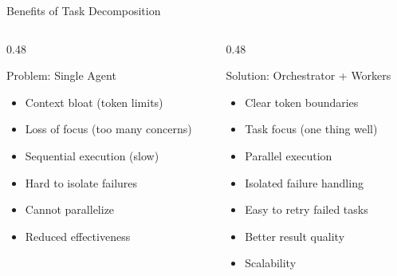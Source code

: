 \documentclass[aspectratio=169,11pt]{beamer}
\begin{document}
\begin{frame}{Benefits of Task Decomposition}
\begin{columns}[T]
\begin{column}{0.48\textwidth}
\begin{alertblock}{Problem: Single Agent}
\begin{itemize}
    \item Context bloat (token limits)
    \item Loss of focus (too many concerns)
    \item Sequential execution (slow)
    \item Hard to isolate failures
    \item Cannot parallelize
    \item Reduced effectiveness
\end{itemize}
\end{alertblock}
\end{column}
\begin{column}{0.48\textwidth}
\begin{exampleblock}{Solution: Orchestrator + Workers}
\begin{itemize}
    \item Clear token boundaries
    \item Task focus (one thing well)
    \item Parallel execution
    \item Isolated failure handling
    \item Easy to retry failed tasks
    \item Better result quality
    \item Scalability
\end{itemize}
\end{exampleblock}
\end{column}
\end{columns}

\vspace{0.3cm}
\begin{center}
\end{center}
\end{frame}
\end{document}
